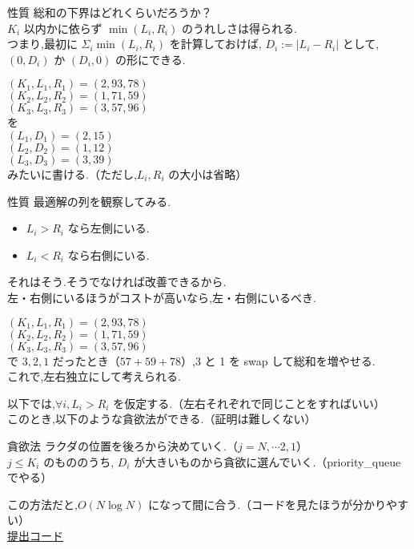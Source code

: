 \documentclass[dvipdfmx,12pt]{beamer}%
\begin{document}
\begin{frame}

\begin{alertblock}{性質}
総和の下界はどれくらいだろうか？\\
$ K_i $ 以内かに依らず $ \min(L_i, R_i) $ のうれしさは得られる.\\
つまり,最初に $ \Sigma_i \min(L_i, R_i) $ を計算しておけば, $ D_i := | L_i - R_i | $ として,
$ (0, D_i) $ か $ (D_i, 0) $ の形にできる.
\end{alertblock}
	$ (K_1, L_1, R_1) = (2, 93, 78) $ \\
	$ (K_2, L_2, R_2) = (1, 71, 59) $ \\
	$ (K_3, L_3, R_3) = (3, 57, 96) $ \\
を\\
	$ (L_1, D_1) = (2, 15) $ \\
	$ (L_2, D_2) = (1, 12) $ \\
	$ (L_3, D_3) = (3, 39) $ \\
みたいに書ける.（ただし,$ L_i, R_i $ の大小は省略）

\end{frame}

\begin{frame}
\begin{alertblock}{性質}
最適解の列を観察してみる.
\begin{itemize}
	\item $ L_i > R_i $ なら左側にいる.
	\item $ L_i < R_i $ なら右側にいる.
\end{itemize}
それはそう.そうでなければ改善できるから.\\
左・右側にいるほうがコストが高いなら,左・右側にいるべき.
\end{alertblock}
	$ (K_1, L_1, R_1) = (2, 93, 78) $ \\
	$ (K_2, L_2, R_2) = (1, 71, 59) $ \\
	$ (K_3, L_3, R_3) = (3, 57, 96) $ \\
で $ 3, 2, 1$ だったとき（$57 + 59 + 78$）,3 と 1 を swap して総和を増やせる.\\
これで,左右独立にして考えられる.
\end{frame}

\begin{frame}
以下では,$ \forall i, L_i > R_i $ を仮定する.（左右それぞれで同じことをすればいい）\\
このとき,以下のような貪欲法ができる.（証明は難しくない）
\begin{block}{貪欲法}
	ラクダの位置を後ろから決めていく.（$ j = N, \cdots 2, 1$）\\
	$ j \leq K_i $ のもののうち, $ D_i $ が大きいものから貪欲に選んでいく.（priority\_queueでやる）
\end{block}
この方法だと,$ O(N \log N)$ になって間に合う.（コードを見たほうが分かりやすい）\\
\href{https://atcoder.jp/contests/aising2020/submissions/15270723}{提出コード}
\end{frame}
\end{document}
